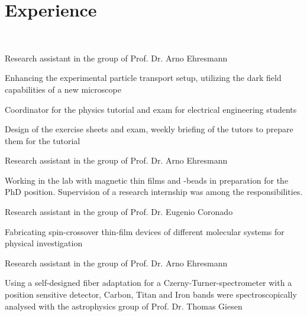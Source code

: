 \section{Experience}
 \\
\begin{tightemize}
\item Research assistant in the group of Prof. Dr. Arno Ehresmann

Enhancing the experimental particle transport setup, utilizing the dark field capabilities of a new microscope
\end{tightemize}
\begin{tightemize}
\item Coordinator for the physics tutorial and exam for electrical engineering students

Design of the exercise sheets and exam, weekly briefing of the tutors to prepare them for the tutorial 
\end{tightemize}
\begin{tightemize}
\item Research assistant in the group of Prof. Dr. Arno Ehresmann

Working in the lab with magnetic thin films and -beads in preparation for the PhD position. Supervision of a research internship was among the responsibilities.
\end{tightemize}
\begin{tightemize}
\item Research assistant in the group of Prof. Dr. Eugenio Coronado

Fabricating spin-crossover thin-film devices of different molecular systems for physical investigation   
\end{tightemize}
\begin{tightemize}
\item Research assistant in the group of Prof. Dr. Arno Ehresmann

Using a self-designed fiber adaptation for a Czerny-Turner-spectrometer with a position sensitive detector, Carbon, Titan and Iron bands were spectroscopically analysed with the astrophysics group of Prof. Dr. Thomas Giesen
\end{tightemize}
